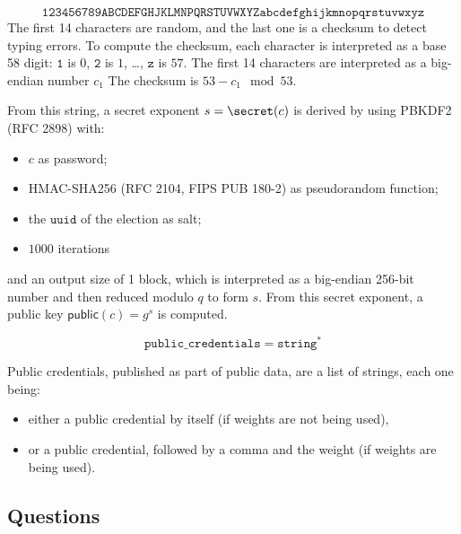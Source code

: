 \documentclass[a4paper]{article}
\newcommand{\public}{\textsf{public}}
\newcommand{\jstring}{\texttt{string}}
\newcommand{\uuid}{\texttt{uuid}}
\begin{document}
\[\texttt{123456789ABCDEFGHJKLMNPQRSTUVWXYZabcdefghijkmnopqrstuvwxyz}\]
The first 14 characters are random, and the last one is a checksum to
detect typing errors. To compute the checksum, each character is
interpreted as a base 58 digit: $\texttt{1}$ is $0$, $\texttt{2}$ is
$1$, \dots, $\texttt{z}$ is $57$. The first 14 characters are
interpreted as a big-endian number $c_1$ The checksum is $53-c_1\mod
53$.

From this string, a secret exponent $s=\secret(c)$ is derived by using
PBKDF2 (RFC 2898) with:
\begin{itemize}
\item $c$ as password;
\item HMAC-SHA256 (RFC 2104, FIPS PUB 180-2) as pseudorandom function;
\item the $\uuid$ of the election as salt;
\item $1000$ iterations
\end{itemize}
and an output size of 1 block, which is interpreted as a big-endian
256-bit number and then reduced modulo $q$ to form $s$.  From this
secret exponent, a public key $\public(c)=g^s$ is computed.

\[\texttt{public\_credentials}=\jstring^\ast\]

Public credentials, published as part of public data, are a list of strings, each one
being:
\begin{itemize}
\item either a public credential by itself (if weights are not being
  used),
\item or a public credential, followed by a comma and the weight (if
  weights are being used).
\end{itemize}

\subsection{Questions}
\label{questions}

\newcommand{\question}{\texttt{question}}

\newcommand{\blank}{\textsf{blank}}
\newcommand{\minlabel}{\textsf{min}}
\newcommand{\maxlabel}{\textsf{max}}
\newcommand{\answers}{\textsf{answers}}
\end{document}
